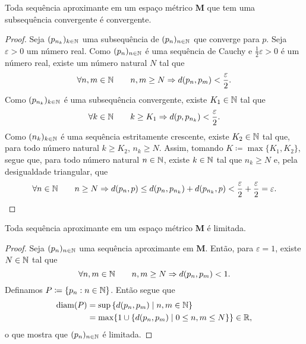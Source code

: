 \begin{prop}
Toda sequência aproximante em um espaço métrico $\bm M$ que tem uma subsequência convergente é convergente.
\end{prop}
\begin{proof}
	Seja $(p_{n_k})_{k \in \mathbb{N}}$ uma subsequência de $(p_n)_{n \in \mathbb{N}}$ que converge  para $p$. Seja $\varepsilon > 0$ um número real. Como $(p_n)_{n \in \mathbb{N}}$ é uma sequência de Cauchy e $\frac{1}{2}\varepsilon > 0$ é um número real, existe um número natural $N$ tal que
	\begin{equation*}
	\forall n,m \in \mathbb{N} \qquad n,m \geq N \Rightarrow d(p_n,p_m) < \frac{\varepsilon}{2}.
	\end{equation*}
Como $(p_{n_k})_{k \in \mathbb{N}}$ é uma subsequência convergente, existe $K_1 \in \mathbb{N}$ tal que
	\begin{equation*}
	\forall k \in \mathbb{N} \qquad k \geq K_1 \Rightarrow d(p,p_{n_k}) < \frac{\varepsilon}{2}.
	\end{equation*}
Como $(n_k)_{k \in \mathbb{N}}$ é uma sequência estritamente crescente, existe $K_2 \in \mathbb{N}$ tal que, para todo número natural $k \geq K_2$, $n_k \geq N$. Assim, tomando $K \coloneqq \max\{K_1,K_2\}$, segue que, para todo número natural $n \in \mathbb{N}$, existe $k \in \mathbb{N}$ tal que $n_k \geq N$ e,  pela desigualdade triangular, que
	\begin{equation*}
	\forall n \in \mathbb{N} \qquad n \geq N \Rightarrow d(p_n,p) \leq d(p_n,p_{n_k}) + d(p_{n_k},p) < \frac{\varepsilon}{2}+\frac{\varepsilon}{2}=\varepsilon.
	\end{equation*}
\end{proof}

\begin{prop}
Toda sequência aproximante em um espaço métrico $\bm M$ é limitada.
\end{prop}
\begin{proof}
Seja $(p_n)_{n \in \mathbb{N}}$ uma sequência aproximante em $\bm M$. Então, para $\varepsilon=1$, existe $N \in \mathbb{N}$ tal que
	\begin{equation*}
	\forall n,m \in \mathbb{N} \qquad n,m \geq N \Rightarrow d(p_n,p_m)<1.
	\end{equation*}
	Definamos $P \coloneqq \{p_n : n \in \mathbb{N}\}$. Então segue que
	\begin{align*}
	\operatorname{diam}(P) &= \sup \left\{d(p_n,p_m) \;\middle\vert\; n,m \in \mathbb{N} \right\} \\
		&= \max\{1 \cup \left\{d(p_n,p_m) \;\middle\vert\; 0 \leq n,m \leq N \right\}\} \in \mathbb{R},
	\end{align*}
o que mostra que $(p_n)_{n \in \mathbb{N}}$ é limitada.
\end{proof}

